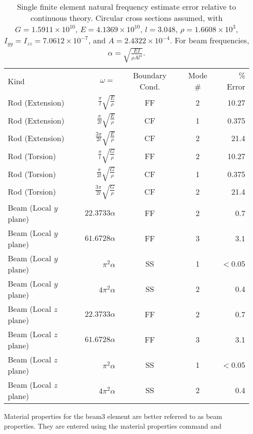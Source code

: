 \documentclass[12pt]{article}
\newcommand*{\command}[1]{\textsf{#1}}
\begin{document}
\begin{table}[htbp]
  \centering
  \begin{tabular}{|l|r|c|c|r|}
    \hline
    Kind&$\omega=$&Boundary Cond.&Mode \# &\% Error\\
    \hhline{|=====|}
    Rod (Extension)&$\frac{\pi}{l}\sqrt{\frac{E}{\rho}}$&FF&2&10.27\\
    \hline
    Rod (Extension)&$\frac{\pi}{2l}\sqrt{\frac{E}{\rho}}$&CF&1&0.375\\
    \hline
    Rod (Extension)&$\frac{3\pi}{2l}\sqrt{\frac{E}{\rho}}$&CF&2&21.4\\
    \hline
    Rod (Torsion)&$\frac{\pi}{l}\sqrt{\frac{G}{\rho}}$&FF&2&10.27\\
    \hline
    Rod (Torsion)&$\frac{\pi}{2l}\sqrt{\frac{G}{\rho}}$&CF&1&0.375\\
    \hline
    Rod (Torsion)&$\frac{3\pi}{2l}\sqrt{\frac{G}{\rho}}$&CF&2&21.4\\
    \hline
    Beam (Local $y$ plane)&$22.3733\alpha$&FF&2&0.7\\
    \hline
    Beam (Local $y$ plane)&$61.6728\alpha$&FF&3&3.1\\
    \hline
    Beam (Local $y$ plane)&$\pi^2\alpha$&SS&1&$<$0.05\\
    \hline
    Beam (Local $y$ plane)&$4\pi^2\alpha$&SS&2&0.4\\
    \hline
    Beam (Local $z$ plane)&$22.3733\alpha$&FF&2&0.7\\
    \hline
    Beam (Local $z$ plane)&$61.6728\alpha$&FF&3&3.1\\
    \hline
    Beam (Local $z$ plane)&$\pi^2\alpha$&SS&1&$<$0.05\\
    \hline
    Beam (Local $z$ plane)&$4\pi^2\alpha$&SS&2&0.4\\
    \hline
  \end{tabular} 
\caption{Single finite element natural frequency estimate error relative to continuous theory. Circular cross sections assumed, with $G=1.5911\times 10^{10}$, $E= 4.1369\times 10^{10}$, $l=3.048$, $\rho=1.6608\times 10^3$, $I_{yy}=I_{zz}=7.0612\times 10^{-7}$, and $A=2.4322\times 10^{-4}$. For beam frequencies, $\alpha=\sqrt{\frac{E I}{\rho A l^4}}$.
} 
\end{table}
Material properties for the \command{beam3} element are better referred to as beam
properties. They are entered using the material properties command and
\end{document}
